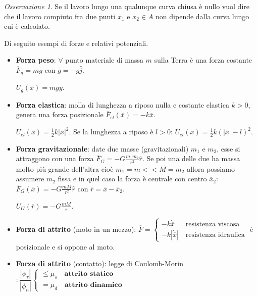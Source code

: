 \documentclass{book}
\theoremstyle{plain}
\theoremstyle{plain}
\theoremstyle{plain}
\theoremstyle{plain}
\theoremstyle{plain}
\theoremstyle{definition}
\theoremstyle{remark}
\newtheorem*{oss}{Osservazione}
\theoremstyle{definition}
\begin{document}
\begin{oss}
    Se il lavoro lungo una qualunque curva chiusa è nullo vuol dire che il lavoro compiuto fra due punti $\overline{x}_1$ e $\overline{x}_2 \in A$ non dipende dalla curva lungo cui è calcolato.
\end{oss}

\noindent Di seguito esempi di forze e relativi potenziali.
\begin{itemize}
    \item \textbf{Forza peso}: $\forall$ punto materiale di massa $m$ sulla Terra è una forza costante $\overline{F}_{g}=m \overline{g}$ con $\overline{g}=-g \hat{j}$.

    \noindent $U_g(\overline{x})=mgy$.
    \item \textbf{Forza elastica}: molla di lunghezza a riposo nulla e costante elastica $k>0$, genera una forza posizionale $\overline{F}_{el}(\overline{x})=-k\overline{x}$.

    \noindent $U_{el}(\overline{x})=\frac{1}{2}k\left|\overline{x}\right|^2$. Se la lunghezza a riposo è $l>0$: $U_{el}(\overline{x})=\frac{1}{2}k\left(\left|\overline{x}\right|-l\right)^2$.
    \item \textbf{Forza gravitazionale}: date due masse (gravitazionali) $m_1$ e $m_2$, esse si attraggono con una forza $\overline{F}_{G}=-G \frac{m_{1} m_{2}}{r^{2}} \hat{r}$. Se poi una delle due ha massa molto più grande dell'altra cioè $m_{1}=m<<M=m_{2}$ allora possiamo assumere $m_2$ fissa e in quel caso la forza è centrale con centro $\overline{x}_{2}$: $\overline{F}_G(\overline{x})=-G \frac{mM}{r^{2}} \hat{r}$ con $\overline{r}=\overline{x}-\overline{x}_2$.

    \noindent $U_G(\overline{r})=-G \frac{mM}{r}$.
    \item \textbf{Forza di attrito} (moto in un mezzo): $\overline{F}=
    \begin{cases}
        -k\dot{\overline{x}} \; \; \quad \text{resistenza viscosa} \\
        -k|\dot{\overline{x}}| \quad \text{resistenza idraulica}
    \end{cases}$
    è posizionale e si oppone al moto.
    \item \textbf{Forza di attrito} (contatto): legge di Coulomb-Morin$: \dfrac{\left|\phi_{\tau}\right|}{\left|\phi_{n}\right|}
    \begin{cases}
        \leq \mu_{s} \quad \textbf{attrito statico} \\
        = \mu_{d} \quad \textbf{attrito dinamico}
    \end{cases}$
\end{itemize}
\end{document}
